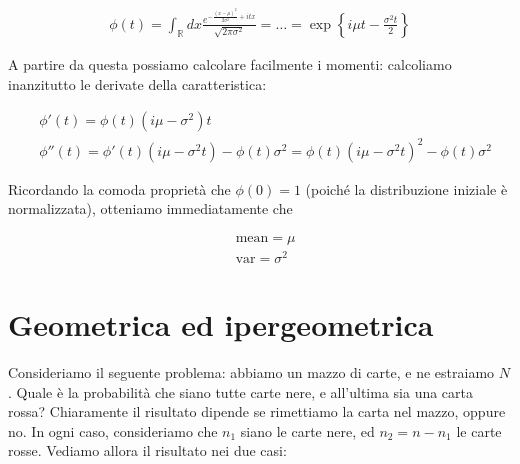 \documentclass{report}
\begin{document}
\begin{align}
    \phi(t) = \int_{\mathbb{R}} dx \frac{e^{-\frac{(x-\mu)^2}{2\sigma^2} + itx}}{\sqrt{2\pi\sigma^2}} = \ldots = \exp\left\{i\mu t - \frac{\sigma^2 t}{2} \right\}
\end{align}

A partire da questa possiamo calcolare facilmente i momenti: calcoliamo inanzitutto le derivate della caratteristica: 

\begin{align}
    &\phi'(t) = \phi(t)(i\mu - \sigma^2)t \\
    &\phi''(t) = \phi'(t)(i\mu - \sigma^2t) - \phi(t)\sigma^2 = \phi(t)(i\mu - \sigma^2 t)^2 - \phi(t)\sigma^2
\end{align}

Ricordando la comoda proprietà che \(\phi(0) = 1\) (poiché la distribuzione iniziale è normalizzata), otteniamo immediatamente che 

\begin{align}
    &\text{mean} = \mu \\
    &\text{var} = \sigma^2
\end{align}



\section{Geometrica ed ipergeometrica}

Consideriamo il seguente problema: abbiamo un mazzo di carte, e ne estraiamo \(N\). Quale è la probabilità che siano tutte carte nere, e all'ultima sia una carta rossa? Chiaramente il risultato dipende se rimettiamo la carta nel mazzo, oppure no. In ogni caso, consideriamo che \(n_1\) siano le carte nere, ed \(n_2 = n - n_1\) le carte rosse. Vediamo allora il risultato nei due casi: 
\end{document}
